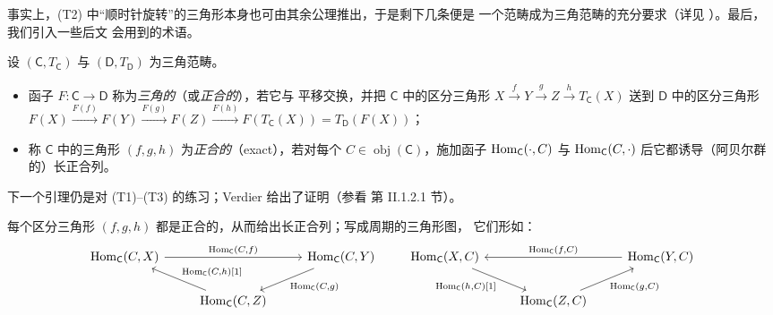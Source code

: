 事实上，(T2) 中“顺时针旋转”的三角形本身也可由其余公理推出，于是剩下几条便是
一个范畴成为三角范畴的充分要求（详见 \cite{May01}）。最后，我们引入一些后文
会用到的术语。

\begin{Def}\label{def:3.4}
设 $(\mathsf C,T_{\mathsf C})$ 与 $(\mathsf D,T_{\mathsf D})$ 为三角范畴。
\begin{itemize}
  \item 函子 $F:\mathsf C\to\mathsf D$ 称为\emph{三角的}（或\emph{正合的}），若它与
        平移交换，并把 $\mathsf C$ 中的区分三角形
        $X\xrightarrow{f}Y\xrightarrow{g}Z\xrightarrow{h}T_{\mathsf C}(X)$ 送到
        $\mathsf D$ 中的区分三角形
        $F(X)\xrightarrow{F(f)}F(Y)\xrightarrow{F(g)}F(Z)
        \xrightarrow{F(h)}F(T_{\mathsf C}(X))=T_{\mathsf D}(F(X))$；
  \item 称 $\mathsf C$ 中的三角形 $(f,g,h)$ 为\emph{正合的}（exact），若对每个
        $C\in\operatorname{obj}(\mathsf C)$，施加函子 $\operatorname{Hom}_{\mathsf C}(\cdot,C)$
        与 $\operatorname{Hom}_{\mathsf C}(C,\cdot)$ 后它都诱导（阿贝尔群的）长正合列。
\end{itemize}
\end{Def}

下一个引理仍是对 (T1)–(T3) 的练习；Verdier 给出了证明（参看 \cite{Ver96}
第 II.1.2.1 节）。

\begin{Lem}\label{lem:3.5}
每个区分三角形 $(f,g,h)$ 都是正合的，从而给出长正合列；写成周期的三角形图，
它们形如：
\[
  \begin{tikzcd}
    \Hom_{\mathsf C}(C,X) \arrow[rr, "{\Hom_{\mathsf C}(C,f)}"] & &
      \Hom_{\mathsf C}(C,Y) \arrow[dl, "{\Hom_{\mathsf C}(C,g)}"] \\
    & \Hom_{\mathsf C}(C,Z) \arrow[ul, "{\Hom_{\mathsf C}(C,h){[}1{]}}"'] &
  \end{tikzcd}
  \qquad
  \begin{tikzcd}
    \Hom_{\mathsf C}(X,C) \arrow[dr, "{\Hom_{\mathsf C}(h,C){[}1{]}}"'] & &
      \Hom_{\mathsf C}(Y,C) \arrow[ll, "{\Hom_{\mathsf C}(f,C)}"'] \\
    & \Hom_{\mathsf C}(Z,C) \arrow[ur, "{\Hom_{\mathsf C}(g,C)}"'] &
  \end{tikzcd}
\]
\end{Lem}

